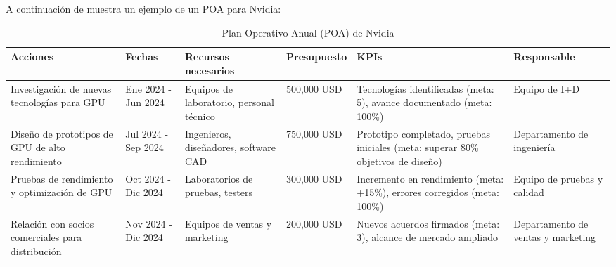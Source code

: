 \documentclass{article}
\begin{document}
A continuación de muestra un ejemplo de un POA para Nvidia:

\begin{table}[H]
  \centering
  \renewcommand{\arraystretch}{1.5}
  \setlength{\tabcolsep}{4pt}
  \begin{tabular}{|p{2.3cm}|p{2cm}|p{3.2cm}|p{1.8cm}|p{3.5cm}|p{2.5cm}|}
    \hline
    \textbf{Acciones} & \textbf{Fechas} & \textbf{Recursos necesarios} & \textbf{Presupuesto} & \textbf{KPIs} & \textbf{Responsable} \\ \hline
    Investigación de nuevas tecnologías para GPU & Ene 2024 - Jun 2024 & Equipos de laboratorio, personal técnico & 500,000 USD & Tecnologías identificadas (meta: 5), avance documentado (meta: 100\%) & Equipo de I+D \\ \hline
    Diseño de prototipos de GPU de alto rendimiento & Jul 2024 - Sep 2024 & Ingenieros, diseñadores, software CAD & 750,000 USD & Prototipo completado, pruebas iniciales (meta: superar 80\% objetivos de diseño) & Departamento de ingeniería \\ \hline
    Pruebas de rendimiento y optimización de GPU & Oct 2024 - Dic 2024 & Laboratorios de pruebas, testers & 300,000 USD & Incremento en rendimiento (meta: +15\%), errores corregidos (meta: 100\%) & Equipo de pruebas y calidad \\ \hline
    Relación con socios comerciales para distribución & Nov 2024 - Dic 2024 & Equipos de ventas y marketing & 200,000 USD & Nuevos acuerdos firmados (meta: 3), alcance de mercado ampliado & Departamento de ventas y marketing \\ \hline
  \end{tabular}
  \caption{Plan Operativo Anual (POA) de Nvidia}
  \label{tab:POA}
\end{table}
\vspace{-1.2cm}
\end{document}

